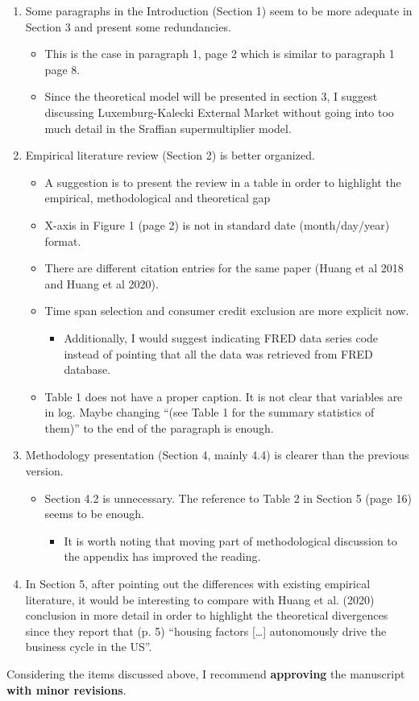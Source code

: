 \documentclass[11pt]{article}
\begin{document}
\begin{enumerate}
\item Some paragraphs in the Introduction (Section 1) seem to be more adequate in Section 3 and present some redundancies.
\begin{itemize}
\item This is the case in paragraph 1, page 2 which is  similar to paragraph 1 page 8.
\item Since the theoretical model will be presented in section 3, I suggest discussing Luxemburg-Kalecki External Market without going into too much detail in the Sraffian supermultiplier model.
\end{itemize}
\item Empirical literature review (Section 2) is better organized.
\begin{itemize}
\item A suggestion is to present the review in a table in order to highlight the empirical, methodological and theoretical gap
\item X-axis in Figure 1 (page 2) is not in standard date (month/day/year) format.
\item There are different citation entries for the same paper (Huang et al 2018 and Huang et al 2020).
\item Time span selection and consumer credit exclusion are more explicit now.
\begin{itemize}
\item Additionally, I would suggest indicating FRED data series code instead of pointing that all the data was retrieved from FRED database.
\end{itemize}
\item Table 1 does not have a proper caption. It is not clear that variables are in log. Maybe changing ``(see Table 1 for the summary statistics of them)'' to the end of the paragraph is enough.
\end{itemize}
\item Methodology presentation (Section 4, mainly 4.4) is clearer than the previous version.
\begin{itemize}
\item Section 4.2 is unnecessary. The reference to Table 2 in Section 5 (page 16) seems to be enough.
\begin{itemize}
\item It is worth noting that moving part of methodological discussion to the appendix has improved the reading.
\end{itemize}
\end{itemize}
\item In Section 5, after pointing out the differences with existing empirical literature, it would be interesting to compare with Huang et al. (2020) conclusion in more detail in order to highlight the theoretical divergences since they report that (p. 5) ``housing factors [\ldots{}]   autonomously drive the business cycle in the US''.
\end{enumerate}

\noindent Considering the items discussed above, I recommend  \textbf{approving} the manuscript \textbf{with minor revisions}.
\end{document}
